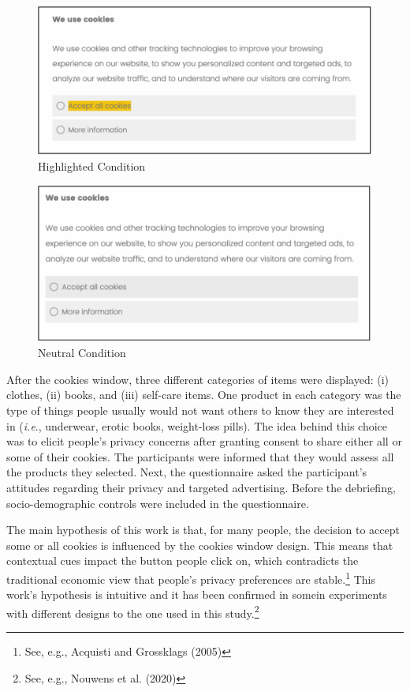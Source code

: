 \documentclass[
  11pt,
  letterpaper,
]{article}
\begin{document}
\begin{figure}

{\centering \includegraphics[width=0.85\linewidth]{Picture1} 

}

\caption{Highlighted Condition}\label{fig:highlighted}
\end{figure}

\begin{figure}

{\centering \includegraphics[width=0.85\linewidth]{Picture2} 

}

\caption{Neutral Condition}\label{fig:neutral}
\end{figure}

After the cookies window, three different categories of items were displayed: (i) clothes, (ii) books, and (iii) self-care items. One product in each category was the type of things people usually would not want others to know they are interested in (\emph{i.e}., underwear, erotic books, weight-loss pills). The idea behind this choice was to elicit people's privacy concerns after granting consent to share either all or some of their cookies. The participants were informed that they would assess all the products they selected. Next, the questionnaire asked the participant's attitudes regarding their privacy and targeted advertising. Before the debriefing, socio-demographic controls were included in the questionnaire.

The main hypothesis of this work is that, for many people, the decision to accept some or all cookies is influenced by the cookies window design. This means that contextual cues impact the button people click on, which contradicts the traditional economic view that people's privacy preferences are stable.\footnote{See, e.g., Acquisti and Grossklags (2005)} This work's hypothesis is intuitive and it has been confirmed in somein experiments with different designs to the one used in this study.\footnote{See, e.g., Nouwens et al. (2020)}
\end{document}
